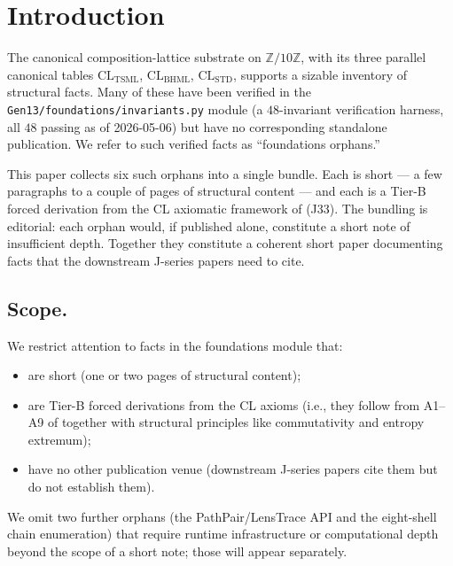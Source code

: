 \documentclass[11pt,reqno]{amsart}
\theoremstyle{plain}
\theoremstyle{definition}
\theoremstyle{remark}
\newcommand{\Z}{\mathbb{Z}}
\newcommand{\TSML}{\mathrm{TSML}}
\newcommand{\BHML}{\mathrm{BHML}}
\newcommand{\STD}{\mathrm{STD}}
\begin{document}
\tableofcontents

\section{Introduction}

The canonical composition-lattice substrate on $\Z/10\Z$, with its
three parallel canonical tables $\mathrm{CL}_\TSML$, $\mathrm{CL}_\BHML$,
$\mathrm{CL}_\STD$, supports a sizable inventory of structural facts.
Many of these have been verified in the
\texttt{Gen13/foundations/invariants.py} module (a $48$-invariant
verification harness, all $48$ passing as of 2026-05-06) but have no
corresponding standalone publication. We refer to such verified facts
as ``foundations orphans.''

This paper collects six such orphans into a single bundle. Each is
short --- a few paragraphs to a couple of pages of structural
content --- and each is a Tier-B forced derivation from the CL
axiomatic framework of \cite{SandersForcing} (J33). The bundling is
editorial: each orphan would, if published alone, constitute a
short note of insufficient depth. Together they constitute a coherent
short paper documenting facts that the downstream J-series papers
\cite{SandersGishThreeSubstrate, SandersGishHARMONYLadder,
SandersGishWobble, SandersGishFourCore} need to cite.

\subsection{Scope.}
We restrict attention to facts in the foundations module that:
\begin{itemize}
\item are short (one or two pages of structural content);
\item are Tier-B forced derivations from the CL axioms (i.e., they
follow from A1--A9 of \cite{SandersForcing} together with structural
principles like commutativity and entropy extremum);
\item have no other publication venue (downstream J-series papers
cite them but do not establish them).
\end{itemize}

We omit two further orphans (the PathPair/LensTrace API and the
eight-shell chain enumeration) that require runtime infrastructure
or computational depth beyond the scope of a short note; those
will appear separately.
\end{document}
